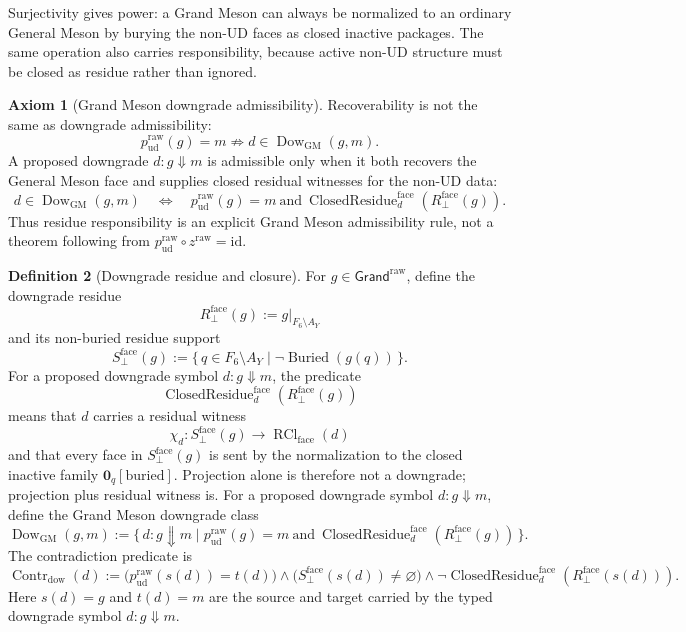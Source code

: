 \documentclass[11pt]{article}
\theoremstyle{definition}
\newtheorem{definition}{Definition}
\newtheorem{axiom}[definition]{Axiom}
\theoremstyle{plain}
\DeclareMathOperator{\Dow}{Dow}
\DeclareMathOperator{\Contr}{Contr}
\DeclareMathOperator{\ClosedResidue}{ClosedResidue}
\DeclareMathOperator{\Buried}{Buried}
\DeclareMathOperator{\RCl}{RCl}
\newcommand{\qu}{\mathrm u}
\newcommand{\qd}{\mathrm d}
\begin{document}
Surjectivity gives power: a Grand Meson can always be normalized to an
ordinary General Meson by burying the non-UD faces as closed inactive
packages.  The same operation also carries responsibility, because active
non-UD structure must be closed as residue rather than ignored.

\begin{axiom}[Grand Meson downgrade admissibility]
Recoverability is not the same as downgrade admissibility:
\[
  p^{\mathrm{raw}}_{\qu\qd}(g)=m
  \not\Rightarrow
  d\in\Dow_{\mathrm{GM}}(g,m).
\]
A proposed downgrade \(d:g\Downarrow m\) is admissible only when it both
recovers the General Meson face and supplies closed residual witnesses for
the non-UD data:
\[
  d\in\Dow_{\mathrm{GM}}(g,m)
  \quad\Longleftrightarrow\quad
  p^{\mathrm{raw}}_{\qu\qd}(g)=m
  \ \text{and}\
  \ClosedResidue^{\mathrm{face}}_{d}
  (R^{\mathrm{face}}_{\perp}(g)).
\]
Thus residue responsibility is an explicit Grand Meson admissibility rule,
not a theorem following from
\(p^{\mathrm{raw}}_{\qu\qd}\circ z^{\mathrm{raw}}=\mathrm{id}\).
\end{axiom}

\begin{definition}[Downgrade residue and closure]
For \(g\in\mathsf{Grand}^{\mathrm{raw}}\), define the downgrade residue
\[
  R^{\mathrm{face}}_{\perp}(g):=g|_{F_6\setminus A_Y}
\]
and its non-buried residue support
\[
  S^{\mathrm{face}}_{\perp}(g)
  :=
  \{\,q\in F_6\setminus A_Y\mid
  \neg\Buried(g(q))\,\}.
\]
For a proposed downgrade symbol \(d:g\Downarrow m\), the predicate
\[
  \ClosedResidue^{\mathrm{face}}_d(R^{\mathrm{face}}_{\perp}(g))
\]
means that \(d\) carries a residual witness
\[
  \chi_d:S^{\mathrm{face}}_{\perp}(g)\longrightarrow
  \RCl_{\mathrm{face}}(d)
\]
and that every face in \(S^{\mathrm{face}}_{\perp}(g)\) is sent by the
normalization to the closed inactive family
\(\mathbf 0_q[\mathrm{buried}]\).  Projection alone is therefore not a
downgrade; projection plus residual witness is.
For a proposed downgrade symbol \(d:g\Downarrow m\), define the Grand
Meson downgrade class
\[
  \Dow_{\mathrm{GM}}(g,m)
  :=
  \{\,d:g\Downarrow m
  \mid
  p^{\mathrm{raw}}_{\qu\qd}(g)=m
  \ \mathrm{and}\
  \ClosedResidue^{\mathrm{face}}_d(R^{\mathrm{face}}_{\perp}(g))\,\}.
\]
The contradiction predicate is
\[
  \Contr_{\mathrm{dow}}(d)
  :=
  \bigl(p^{\mathrm{raw}}_{\qu\qd}(s(d))=t(d)\bigr)
  \wedge
  \bigl(S^{\mathrm{face}}_{\perp}(s(d))\ne\varnothing\bigr)
  \wedge
  \neg\ClosedResidue^{\mathrm{face}}_d(R^{\mathrm{face}}_{\perp}(s(d))).
\]
Here \(s(d)=g\) and \(t(d)=m\) are the source and target carried by the
typed downgrade symbol \(d:g\Downarrow m\).
\end{definition}
\end{document}
